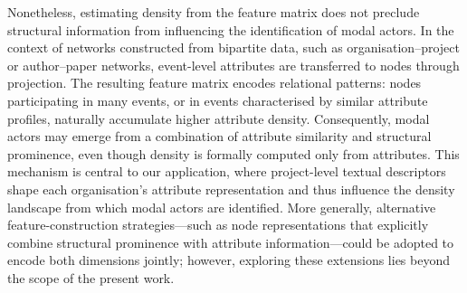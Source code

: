 \documentclass[11pt]{article}
\begin{document}
Nonetheless, estimating density from the feature matrix does not preclude 
structural information from influencing the identification of modal actors. 
In the context of networks constructed from bipartite data, such as organisation--project or author--paper networks, event-level attributes are transferred to nodes through projection. The resulting feature matrix encodes relational patterns: nodes participating in many events, or in events characterised by similar attribute profiles, naturally accumulate higher attribute density. 
Consequently, modal actors may emerge from a combination of attribute similarity and structural prominence, even though density is formally computed only from attributes. This mechanism is central to our application, where project-level textual descriptors shape each organisation’s attribute representation and thus influence the density landscape from which modal actors are identified.
More generally, alternative feature-construction strategies—such as node representations that explicitly combine structural prominence with attribute information—could be adopted to encode both dimensions jointly; however, exploring these extensions lies beyond the scope of the present work.






\end{document}
